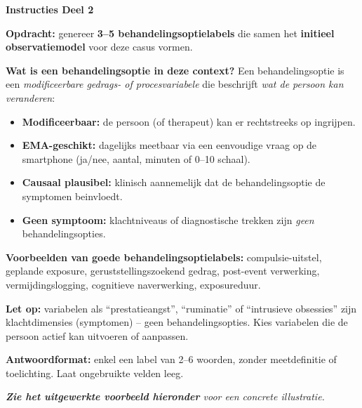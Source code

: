 \documentclass[11pt,a4paper]{article}
\begin{document}
\begin{tcolorbox}[colback=green!3,colframe=ForestGreen,arc=2.5mm,boxrule=0.9pt,
  left=10pt,right=10pt,top=9pt,bottom=9pt]
\textbf{\color{ForestGreen}Instructies Deel 2}

\smallskip\small
\textbf{Opdracht:} genereer \textbf{3--5 behandelingsoptielabels} die samen het
\textbf{initieel observatiemodel} voor deze casus vormen.

\textbf{Wat is een behandelingsoptie in deze context?}
Een behandelingsoptie is een \emph{modificeerbare gedrags- of procesvariabele} die beschrijft
\emph{wat de persoon kan veranderen}:
\begin{itemize}[topsep=2pt,itemsep=1pt]
\item \textbf{Modificeerbaar:} de persoon (of therapeut) kan er rechtstreeks op ingrijpen.
\item \textbf{EMA-geschikt:} dagelijks meetbaar via een eenvoudige vraag op de smartphone
(ja/nee, aantal, minuten of 0--10 schaal).
\item \textbf{Causaal plausibel:} klinisch aannemelijk dat de behandelingsoptie de symptomen beinvloedt.
\item \textbf{Geen symptoom:} klachtniveaus of diagnostische trekken zijn
\emph{geen} behandelingsopties.
\end{itemize}

\textbf{Voorbeelden van goede behandelingsoptielabels:}
compulsie-uitstel, geplande exposure, geruststellingszoekend gedrag, post-event verwerking,
vermijdingslogging, cognitieve naverwerking, exposureduur.

\textbf{Let op:} variabelen als ``prestatieangst'', ``ruminatie'' of ``intrusieve obsessies'' zijn
klachtdimensies (symptomen) -- geen behandelingsopties. Kies variabelen die de persoon
actief kan uitvoeren of aanpassen.

\textbf{Antwoordformat:} enkel een label van 2--6 woorden, zonder meetdefinitie of toelichting.
Laat ongebruikte velden leeg.

\medskip
\textit{\textbf{Zie het uitgewerkte voorbeeld hieronder} voor een concrete illustratie.}
\end{tcolorbox}

\vspace{0.5em}
\nopagebreak[4]
\end{document}
